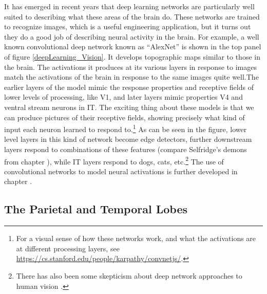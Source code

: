 It has emerged in recent years that deep learning networks are particularly well suited to describing what these areas of the brain do. These networks are trained to recognize images, which is a useful engineering application, but it turns out they do a good job of describing neural activity in the brain. For example, a well known convolutional deep network known as ``AlexNet'' \cite{krizhevsky2012imagenet} is shown in the top panel of figure \ref{deepLearning_Vision}. It develops topographic maps similar to those in the brain. The activations it produces at its various layers in response to images match the activations of the brain in response to the same images quite well.The earlier layers of the model mimic the response properties and receptive fields of lower levels of processing, like V1, and later layers mimic properties V4 and ventral stream neurons in IT. The exciting thing about these models is that we can produce pictures of their receptive fields, showing precisely what kind of input each neuron learned to respond to.\footnote{For a visual sense of how these networks work, and what the activations are at different processing layers, see \url{https://cs.stanford.edu/people/karpathy/convnetjs/}.}  As can be seen in the figure, lower level layers in this kind of network become edge detectors, further downstream layers respond to combinations of these features (compare Selfridge's demons from chapter ), while IT layers respond to dogs, cats, etc.\footnote{There has also been some skepticism about deep network approaches to human vision \cite{bowers2022deep}.} The use of convolutional networks to model neural activations is further developed in chapter .

\subsection{The Parietal and Temporal Lobes}

